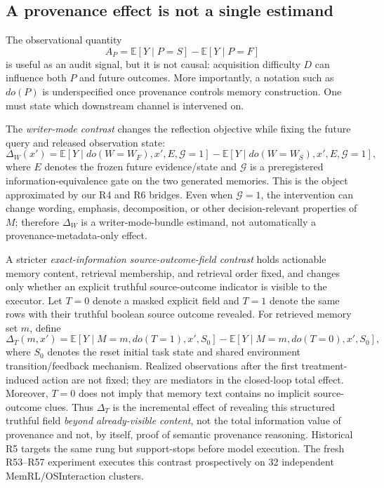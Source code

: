 \subsection{A provenance effect is not a single estimand}
The observational quantity
\begin{equation}
A_P = \mathbb{E}[Y\mid P=S]-\mathbb{E}[Y\mid P=F]
\end{equation}
is useful as an audit signal, but it is not causal: acquisition difficulty $D$ can influence both $P$ and future outcomes. More importantly, a notation such as $do(P)$ is underspecified once provenance controls memory construction. One must state which downstream channel is intervened on.

The \emph{writer-mode contrast} changes the reflection objective while fixing the future query and released observation state:
\begin{equation}
\Delta_W(x') =
\mathbb{E}[Y\mid do(W=W_F),x',E,\mathcal{G}=1]-
\mathbb{E}[Y\mid do(W=W_S),x',E,\mathcal{G}=1],
\label{eq:writer}
\end{equation}
where $E$ denotes the frozen future evidence/state and $\mathcal{G}$ is a preregistered information-equivalence gate on the two generated memories. This is the object approximated by our R4 and R6 bridges. Even when $\mathcal{G}=1$, the intervention can change wording, emphasis, decomposition, or other decision-relevant properties of $M$; therefore $\Delta_W$ is a writer-mode-bundle estimand, not automatically a provenance-metadata-only effect.

A stricter \emph{exact-information source-outcome-field contrast} holds actionable memory content, retrieval membership, and retrieval order fixed, and changes only whether an explicit truthful source-outcome indicator is visible to the executor. Let $T=0$ denote a masked explicit field and $T=1$ denote the same rows with their truthful boolean source outcome revealed. For retrieved memory set $m$, define
\begin{equation}
\Delta_T(m,x') =
\mathbb{E}[Y\mid M=m,do(T=1),x',S_0]-
\mathbb{E}[Y\mid M=m,do(T=0),x',S_0],
\label{eq:metadata}
\end{equation}
where $S_0$ denotes the reset initial task state and shared environment transition/feedback mechanism. Realized observations after the first treatment-induced action are not fixed; they are mediators in the closed-loop total effect. Moreover, $T=0$ does not imply that memory text contains no implicit source-outcome clues. Thus $\Delta_T$ is the incremental effect of revealing this structured truthful field \emph{beyond already-visible content}, not the total information value of provenance and not, by itself, proof of semantic provenance reasoning. Historical R5 targets the same rung but support-stops before model execution. The fresh R53--R57 experiment executes this contrast prospectively on 32 independent MemRL/OSInteraction clusters.

